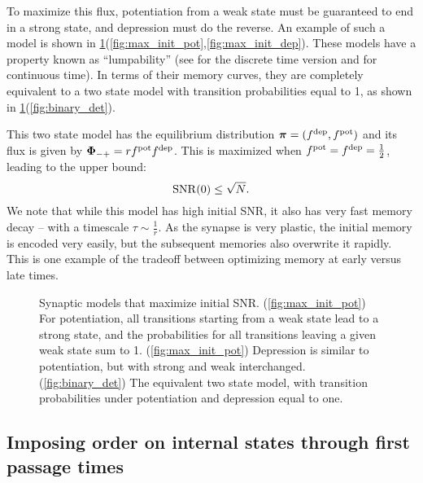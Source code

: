 To maximize this flux, potentiation from a weak state must be guaranteed to end in a strong state, and depression must do the reverse.
An example of such a model is shown in \cref{fig:max_init}(\ref{fig:max_init_pot},\ref{fig:max_init_dep}).
These models have a property known as ``lumpability'' (see \cite[\S6.3]{kemeny1960finite} for the discrete time version and \cite{burke1958markovian,Ball1993Lumpability} for continuous time).
In terms of their memory curves, they are completely equivalent to a two state model with transition probabilities equal to 1, as shown in \cref{fig:max_init}(\ref{fig:binary_det}).

This two state model has the equilibrium distribution $\boldsymbol{\pi}=(f^{\text{dep}},f^{\text{pot}})$ and its flux is given by $\boldsymbol{\Phi}_{-+} = rf^{\text{pot}} f^{\text{dep}}$.
This is maximized when $f^{\text{pot}}=f^{\text{dep}}=\frac{1}{2}$, leading to the upper bound:
%
\begin{equation}\label{eq:max_init}
  \operatorname{SNR}(0) \leq \sqrt{N}.
\end{equation}
%
We note that while this model has high initial SNR, it also has very fast memory decay -- with a timescale $\tau\sim\frac{1}{r}$.
As the synapse is very plastic, the initial memory is encoded very easily, but the subsequent memories also overwrite it rapidly.
This is one example of the tradeoff between optimizing memory at early versus late times.
\begin{figure}[tbp]
 \begin{center}
 \begin{myenuma}
  \label{fig:max_init_pot}\hp
  \label{fig:max_init_dep}\hp
  \label{fig:binary_det}
  \end{myenuma}
 \end{center}
  \caption[Synaptic models that maximize initial SNR]{Synaptic models that maximize initial SNR.
  (\ref{fig:max_init_pot}) For potentiation, all transitions starting from a weak state lead to a strong state, and the probabilities for all transitions leaving a given weak state sum to 1.
  (\ref{fig:max_init_pot}) Depression is similar to potentiation, but with strong and weak interchanged.
  (\ref{fig:binary_det}) The equivalent two state model, with transition probabilities under potentiation and depression equal to one.
  \label{fig:max_init}}
\end{figure}


\subsection{Imposing order on internal states through first passage times}\label{sec:order}


